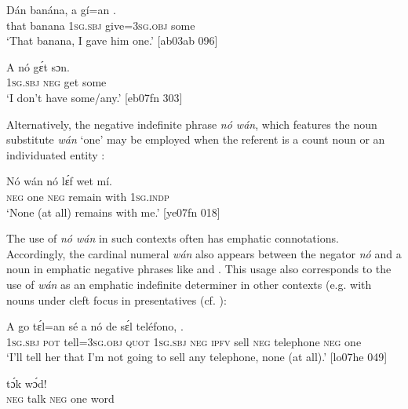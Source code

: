 \ea%
    \label{ex:key:571}
    \gll Dán  banána,  a    gí=an    .\\
that  banana  \textsc{1sg.sbj}  give=\textsc{3sg.obj}  some\\

\glt ‘That banana, I gave him one.’ [ab03ab 096]
\z


\ea%
    \label{ex:key:572}
    \gll A    nó  gɛ́t  sɔn.\\
\textsc{1sg.sbj}  \textsc{neg}  get  some\\

\glt ‘I don’t have some/any.’ [eb07fn 303]
\z

Alternatively, the negative indefinite phrase \textit{nó wán}, which features the noun substitute \textit{wán} ‘one’ may be employed when the referent is a count noun or an individuated entity :


\ea%
    \label{ex:key:573}
    \gll Nó  wán    nó  lɛ́f    wet    mí.\\
\textsc{neg}  one    \textsc{neg}  remain  with    \textsc{1sg.indp}\\

\glt ‘None (at all) remains with me.’ [ye07fn 018]
\z

The use of \textit{nó wán} in such contexts often has emphatic connotations. Accordingly, the cardinal numeral \textit{wán} also appears between the negator \textit{nó} and a noun in emphatic negative phrases like  and . This usage also corresponds to the use of \textit{wán} as an emphatic indefinite determiner in other contexts (e.g. with nouns under cleft focus in presentatives (cf. ):


\ea%
    \label{ex:key:574}
    \gll A    go  tɛ́l=an    sé    a    nó  de  sɛ́l  
  teléfono,      .\\
\textsc{1sg.sbj}  \textsc{pot}  tell=\textsc{3sg.obj}  \textsc{quot}    \textsc{1sg.sbj}  \textsc{neg}  \textsc{ipfv}  sell  
\textsc{neg}  telephone  \textsc{neg}  one\\

\glt ‘I’ll tell her that I’m not going to sell any telephone, none (at all).’ [lo07he 049]
\z


\ea%
    \label{ex:key:575}
    \gll {}  tɔ́k       wɔ́d!\\
\textsc{neg}  talk  \textsc{neg}  one    word\\


